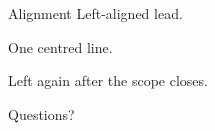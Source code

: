 \documentclass{slides}
\begin{document}
\begin{frame}{Alignment}
Left-aligned lead.

{\centering One centred line.\par}

Left again after the scope closes.
\end{frame}

\begin{frame}
\centering
Questions?
\end{frame}
\end{document}
